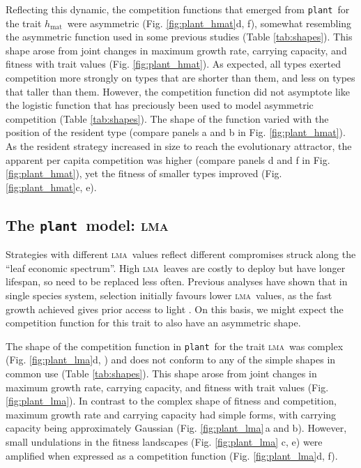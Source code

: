 \documentclass[a4paper,11pt]{article}
\newcommand{\plant}{{\tt plant}}
\newcommand{\hmat}{\ensuremath{h_{\text{mat}}}}
\newcommand{\lma}{\textsc{lma}}
\begin{document}
Reflecting this dynamic, the competition functions that emerged from
\plant\ for the trait \hmat\ were asymmetric
(Fig. \ref{fig:plant_hmat}d, f), somewhat resembling the asymmetric
function used in some previous studies \citep{Law-1997, Kisdi-1999,
  Geritz-1999, Egas-2004, Calcagno-2006, DAndrea-2013} (Table
\ref{tab:shapes}). This shape arose from joint changes in maximum
growth rate, carrying capacity, and fitness with trait values
(Fig. \ref{fig:plant_hmat}). As expected, all types exerted
competition more strongly on types that are shorter than them, and
less on types that taller than them. However, the competition function
did not asymptote like the logistic function that has preciously been
used to model asymmetric competition (Table \ref{tab:shapes}). The
shape of the function varied with the position of the resident type
(compare panels a and b in Fig. \ref{fig:plant_hmat}). As the resident
strategy increased in size to reach the evolutionary attractor, the apparent per capita competition was higher (compare panels d and f in Fig. \ref{fig:plant_hmat}), yet the fitness of smaller types improved (Fig. \ref{fig:plant_hmat}c, e).  

\subsection{The \plant\ model: \lma}

Strategies with different \lma\ values reflect different compromises struck along the ``leaf economic spectrum''\citep{Reich-1997,Wright-2004}. High \lma\ leaves are costly to deploy but have longer lifespan, so need to be replaced less often. Previous analyses have shown that in single species system, selection initially favours lower \lma\ values, as the fast growth achieved gives prior access to light \citep{Falster-2017}. On this basis, we might expect the competition function for this trait to also have an asymmetric shape.

The shape of the competition function in \plant\ for the trait \lma\ was complex (Fig. \ref{fig:plant_lma}d, ) and does not conform to any of the simple shapes in common use (Table \ref{tab:shapes}). This shape arose from joint changes in maximum growth rate, carrying capacity, and fitness with trait values (Fig. \ref{fig:plant_lma}). In contrast to the complex shape of fitness and competition, maximum growth rate and carrying capacity had simple forms, with carrying capacity being approximately Gaussian (Fig. \ref{fig:plant_lma}\,a and b). However, small undulations in the fitness landscapes (Fig. \ref{fig:plant_lma} c, e) were amplified when expressed as a competition function (Fig. \ref{fig:plant_lma}d, f). 
\end{document}
